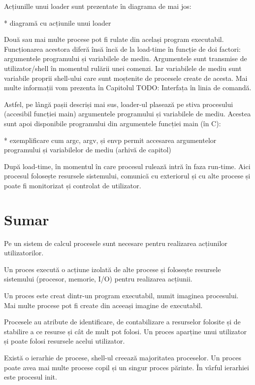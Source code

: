 Acțiunille unui loader sunt prezentate în diagrama de mai jos:

* diagramă cu acțiunile unui loader

Două sau mai multe procese pot fi rulate din același program executabil.
Funcționarea acestora diferă însă încă de la load-time în funcție de doi
factori: argumentele programului și variabilele de mediu. Argumentele sunt
transmise de utilizator/shell în momentul rulării unei comenzi. Iar variabilele
de mediu sunt variabile proprii shell-ului care sunt moștenite de procesele
create de acesta. Mai multe informații vom prezenta în Capitolul TODO: Interfața
în linia de comandă.

Astfel, pe lângă pașii descriși mai sus, loader-ul plasează pe stiva procesului
(accesibil funcției main) argumentele programului și variabilele de mediu.
Acestea sunt apoi disponibile programului din argumentele funcției main (în C):

* exemplificare cum argc, argv, și envp permit accesarea argumentelor programului și variabilelor de mediu (arhivă de capitol)

După load-time, în momentul în care procesul rulează intră în faza run-time.
Aici procesul folosește resursele sistemului, comunică cu exteriorul și cu alte
procese și poate fi monitorizat și controlat de utilizator.

\section{Sumar}
\label{sec:procese-sumar}

Pe un sistem de calcul procesele sunt necesare pentru realizarea acțiunilor
utilizatorilor.

Un proces execută o acțiune izolată de alte procese și folosește resursele
sistemului (procesor, memorie, I/O) pentru realizarea acțiunii.

Un proces este creat dintr-un program executabil, numit imaginea procesului. Mai
multe procese pot fi create din aceeași imagine de executabil.

Procesele au atribute de identificare, de contabilizare a resurselor folosite și
de stabilire a ce resurse și cât de mult pot folosi. Un proces aparține unui
utilizator și poate folosi resursele acelui utilizator.

Există o ierarhie de procese, shell-ul creează majoritatea proceselor. Un proces
poate avea mai multe procese copil și un singur proces părinte. În vârful
ierarhiei este procesul init.

